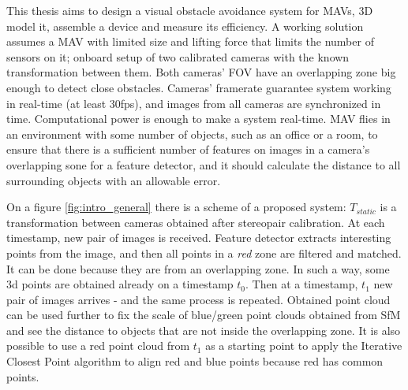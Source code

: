 This thesis aims to design a visual obstacle avoidance system for MAVs, 3D model it, assemble a device and measure its efficiency. 
A working solution assumes a MAV with limited size and lifting force that limits the number of sensors on it; onboard setup of two calibrated cameras with the known transformation between them.
Both cameras' FOV have an overlapping zone big enough to detect close obstacles.
Cameras' framerate guarantee system working in real-time (at least 30fps), and images from all cameras are synchronized in time.
Computational power is enough to make a system real-time.
MAV flies in an environment with some number of objects, such as an office or a room, to ensure that there is a sufficient number of features on images in a camera's overlapping sone for a feature detector, and it should calculate the distance to all surrounding objects with an allowable error.

On a figure \autoref{fig:intro_general} there is a scheme of a proposed system: $T_{static}$ is a transformation between cameras obtained after stereopair calibration. 
At each timestamp, new pair of images is received.
Feature detector extracts interesting points from the image, and then all points in a \textit{red} zone are filtered and matched.
It can be done because they are from an overlapping zone. 
In such a way, some 3d points are obtained already on a timestamp $t_0$. 
Then at a timestamp, $t_1$ new pair of images arrives - and the same process is repeated. 
Obtained point cloud can be used further to fix the scale of blue/green point clouds obtained from SfM and see the distance to objects that are not inside the overlapping zone.
It is also possible to use a red point cloud from $t_1$ as a starting point to apply the Iterative Closest Point algorithm to align red and blue points because red has common points.
